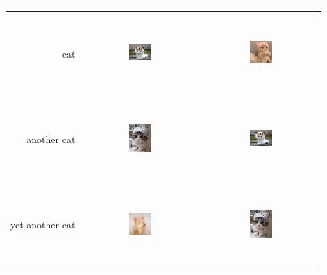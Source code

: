 \documentclass[10pt,a4paper]{report}
\begin{document}
\begin{tabular}{| r c | c |}
	\multicolumn{1}{r}{} &  \multicolumn{1}{c}{} & \multicolumn{1}{c}{} \\ \hline
	cat & \includegraphics[width=0.2\textwidth,height=30mm]{images/2.jpg} & \includegraphics[width=0.2\textwidth, height=30mm]{images/1.jpg} \\ \hline
	another cat & \includegraphics[width=0.2\textwidth,height=30mm]{images/3.jpg} & \includegraphics[width=0.2\textwidth, height=30mm]{images/2.jpg} \\ \hline
	yet another cat & \includegraphics[width=0.2\textwidth,height=30mm]{images/4.jpg} & \includegraphics[width=0.2\textwidth, height=30mm]{images/3.jpg} \\ \hline
\end{tabular} \\
\clearpage
\end{document}
